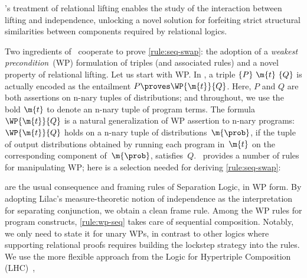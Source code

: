 \begin{result}
\thelogic's treatment of relational lifting enables the study of the interaction
between lifting and independence,
unlocking a novel solution for forfeiting strict structural similarities between components required by relational logics.
\end{result}
Two ingredients of \thelogic\ cooperate to prove
\ref{rule:seq-swap}:
the adoption of a \emph{weakest precondition}~(WP) formulation of triples
(and associated rules)
and a novel property of relational lifting. Let us start with WP.
In \thelogic, a triple $\{P\}\ \m{t}\ \{Q\}$ is actually encoded as
the entailment
$ P \proves \WP {\m{t}} {Q} $.
Here, $P$ and $Q$ are both assertions on \pre n-nary tuples of distributions;
and throughout, we use the bold $\m{t}$ to denote an \pre n-nary
tuple of program terms.
The formula $ \WP {\m{t}} {Q}$  is a natural generalization of WP assertion to \pre n-nary programs:
$\WP {\m{t}} {Q}$
holds on
a \pre n-nary tuple of distributions~$\m{\prob}$,
if the tuple of output distributions
obtained by running each program in~$\m{t}$ on the corresponding component
of~$\m{\prob}$,
satisfies~$Q$.
\thelogic\ provides a number of rules for manipulating WP;
here is a selection needed for deriving \ref{rule:seq-swap}:
\begin{proofrules}
     \label{rule:wp-cons}

     \label{rule:wp-frame}

     \label{rule:wp-seq}

     \label{rule:wp-nest}
\end{proofrules}
 are the usual consequence and framing rules
of Separation Logic, in WP form.
By adopting Lilac's measure-theoretic notion of independence as the interpretation for separating conjunction, we obtain a clean frame rule.
Among the WP rules for program constructs,
\cref{rule:wp-seq} takes care of sequential composition.
Notably, we only need to state it for unary WPs,
in contrast to other logics where supporting relational proofs
requires building the lockstep strategy into the rules.
We use the more flexible approach from the Logic for Hypertriple Composition (LHC)~\cite{d2022proving},
